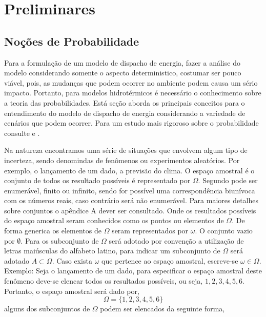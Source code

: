 \chapter{Preliminares}
\section{No\c{c}\~{o}es de Probabilidade}
Para a formula\c{c}\~{a}o de um modelo de dispacho de energia, fazer a an\'{a}lise do modelo considerando somente o aspecto deterministico,
costumar ser pouco vi\'{a}vel, pois, as mudan\c{c}as que podem ocorrer no ambiente podem causa um s\'{e}rio impacto. Portanto, para modelos
hidrot\'{e}rmicos \'{e} necess\'{a}rio o conhecimento sobre a teoria das probabilidades. Est\'{a} se\c{c}\~{a}o aborda os  principais conceitos
para o entendimento do modelo de dispacho de energia considerando a variedade de cen\'{a}rios que podem  ocorrer. Para um estudo mais rigoroso 
sobre o probabilidade consulte  \cite{james} e \cite{magalhaes}. 
\par 
Na natureza encontramos uma s\'{e}rie de situa\c{c}\~{o}es que envolvem algum tipo de incerteza, sendo denomindas de fen\^{o}menos ou
experimentos aleat\'{o}rios. Por exemplo, o lan\c{c}amento de um dado, a previs\~{a}o do clima.
O espa\c{c}o amostral \'{e} o conjunto de todos os resultado poss\'{i}veis \'{e} representado por $\Omega$. Segundo
\cite{magalhaes} pode ser enumer\'{a}vel, finito ou infinito, sendo for poss\'{i}vel uma correspond\^{e}ncia biun\'{i}voca com os n\'{u}meros 
reais, caso contr\'{a}rio ser\'{a} n\~{a}o enumer\'{a}vel. Para maiores detalhes sobre conjuntos o ap\^{e}ndice A dever ser consultado.
Onde os resultados poss\'{i}veis do espa\c{c}o amostral seram conhecidos
como os pontos ou elementos de $\Omega$. De forma generica os elementos de $\Omega$ seram representados por $\omega$.
O conjunto vazio por $\emptyset$. Para os subconjunto de $\Omega$ ser\'{a} adotado por conven\c{c}\~{a}o a utiliza\c{c}\~{a}o de
letras mai\'{u}sculas do alfabeto latino, para indicar um subconjunto de $\Omega$ ser\'{a} adotado $ A \subset \Omega$. Caso exista $\omega$
que pertence ao espa\c{c}o amostral, escreve-se $ \omega \in \Omega$.  
\newline
Exemplo:
\newline
Seja o lan\c{c}amento de um dado, para especificar o espa\c{c}o amostral deste fen\^{o}meno deve-se elencar todos os resultados
poss\'{i}veis, ou seja, $ 1, 2, 3, 4, 5, 6$. Portanto, o espa\c{c}o amostral ser\'{a} dado por, 
$$\Omega =  \{1,2,3,4,5,6\}$$
alguns dos subconjuntos de $\Omega$ podem ser elencados da seguinte forma,
